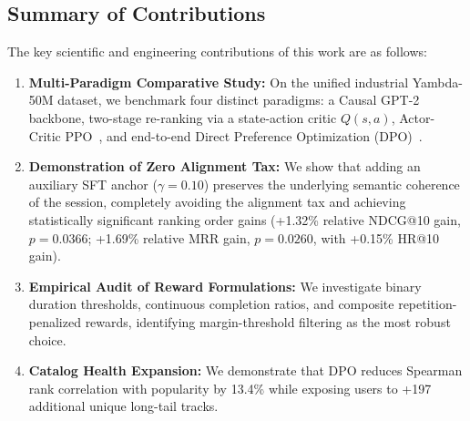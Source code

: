 \subsection{Summary of Contributions}
The key scientific and engineering contributions of this work are as follows:
\begin{enumerate}
    \item \textbf{Multi-Paradigm Comparative Study:} On the unified industrial Yambda-50M dataset, we benchmark four distinct paradigms: a Causal GPT-2 backbone, two-stage re-ranking via a state-action critic $Q(s, a)$, Actor-Critic PPO~\cite{schulman2017proximal}, and end-to-end Direct Preference Optimization (DPO)~\cite{rafailov2023direct}.
    \item \textbf{Demonstration of Zero Alignment Tax:} We show that adding an auxiliary SFT anchor ($\gamma=0.10$) preserves the underlying semantic coherence of the session, completely avoiding the alignment tax and achieving statistically significant ranking order gains (+1.32\% relative NDCG@10 gain, $p = 0.0366$; +1.69\% relative MRR gain, $p = 0.0260$, with +0.15\% HR@10 gain).
    \item \textbf{Empirical Audit of Reward Formulations:} We investigate binary duration thresholds, continuous completion ratios, and composite repetition-penalized rewards, identifying margin-threshold filtering as the most robust choice.
    \item \textbf{Catalog Health Expansion:} We demonstrate that DPO reduces Spearman rank correlation with popularity by 13.4\% while exposing users to +197 additional unique long-tail tracks.
\end{enumerate}
